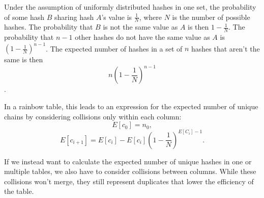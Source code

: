 \documentclass[]{paper}
\begin{document}
Under the assumption of uniformly distributed hashes in one set, the probability of some hash $B$ sharing hash $A$'s value is $\frac{1}{N}$, where $N$ is the number of possible hashes. The probability that $B$ is not the same value as $A$ is then $1 - \frac{1}{N}$. The probability that $n - 1$ other hashes do not have the same value as $A$ is $(1 - \frac{1}{N})^{n - 1}$. The expected number of hashes in a set of $n$ hashes that aren't the same is then
\begin{equation}
n(1 - \frac{1}{N})^{n - 1}
\end{equation}.

In a rainbow table, this leads to an expression for the expected number of unique chains by considering collisions only within each column:
\begin{equation}
E[c_0] = n_0,
\end{equation}
\begin{equation}
E[c_{i+1}] = E[c_i] - E[c_i](1 - \frac{1}{N})^{E[C_i] - 1}.
\end{equation}

If we instead want to calculate the expected number of unique hashes in one or multiple tables, we also have to consider collisions between columns. While these collisions won't merge, they still represent duplicates that lower the efficiency of the table. 
\end{document}

